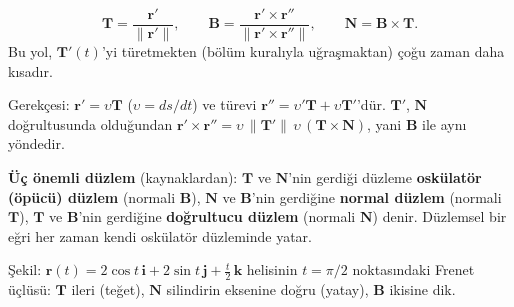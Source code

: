 \begin{teorem}
\[ \mathbf T=\frac{\mathbf r'}{\|\mathbf r'\|},\qquad \mathbf B=\frac{\mathbf r'\times\mathbf r''}{\|\mathbf r'\times\mathbf r''\|},\qquad \mathbf N=\mathbf B\times\mathbf T . \]
Bu yol, $\mathbf T'(t)$'yi türetmekten (bölüm kuralıyla uğraşmaktan) çoğu zaman daha kısadır.
\end{teorem}

Gerekçesi: $\mathbf r'=\upsilon\mathbf T$ ($\upsilon=ds/dt$) ve türevi $\mathbf r''=\upsilon'\mathbf T+\upsilon\mathbf T'$'dür. $\mathbf T'$,
$\mathbf N$ doğrultusunda olduğundan $\mathbf r'\times\mathbf r''=\upsilon\,\|\mathbf T'\|\,\upsilon\,(\mathbf T\times\mathbf N)$, yani $\mathbf B$ ile aynı yöndedir.

\textbf{Üç önemli düzlem} (kaynaklardan): $\mathbf T$ ve $\mathbf N$'nin gerdiği düzleme \textbf{oskülatör (öpücü) düzlem}
(normali $\mathbf B$), $\mathbf N$ ve $\mathbf B$'nin gerdiğine \textbf{normal düzlem} (normali $\mathbf T$), $\mathbf T$ ve $\mathbf B$'nin
gerdiğine \textbf{doğrultucu düzlem} (normali $\mathbf N$) denir. Düzlemsel bir eğri her zaman kendi oskülatör düzleminde yatar.

\begin{center}

{\small Şekil: $\mathbf r(t)=2\cos t\,\mathbf i+2\sin t\,\mathbf j+\frac t2\,\mathbf k$ helisinin $t=\pi/2$ noktasındaki Frenet üçlüsü:
$\mathbf T$ ileri (teğet), $\mathbf N$ silindirin eksenine doğru (yatay), $\mathbf B$ ikisine dik.}
\end{center}

